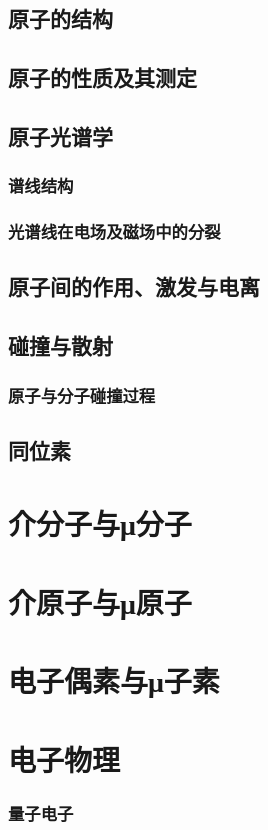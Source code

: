 \documentclass[UTF8]{../06-Physics}
\begin{document}
    \subsection{原子的结构}
    \subsection{原子的性质及其测定}
    \subsection{原子光谱学}
        \subsubsection{谱线结构}
        \subsubsection{光谱线在电场及磁场中的分裂}
    \subsection{原子间的作用、激发与电离}
    \subsection{碰撞与散射}
        \subsubsection{原子与分子碰撞过程}
    \subsection{同位素}
\section{介分子与μ分子}
\section{介原子与μ原子}
\section{电子偶素与μ子素}

\section{电子物理}
  \subsubsection{量子电子}
\end{document}
